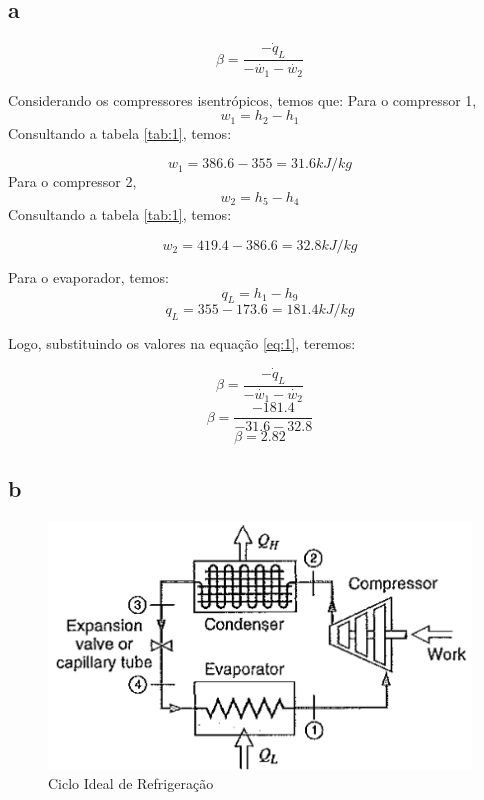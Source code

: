 \documentclass[a4paper, 12pt]{article}
\begin{document}
\subsection{a}

\begin{equation}
\beta = \frac{ -\dot{q}_{L}  }{ -\dot{w_{1}} - \dot{w_{2}} }
\label{eq:1}
\end{equation}

Considerando os compressores isentrópicos, temos que:
Para o compressor 1,
\[w_{1} = h_{2} - h_{1}\]
Consultando a tabela \ref{tab:1}, temos:

\[w_{1} = 386.6 - 355 = 31.6 kJ/kg\]
Para o compressor 2,
\[w_{2} = h_{5} - h_{4}\]
Consultando a tabela \ref{tab:1}, temos:

\[w_{2} = 419.4 - 386.6 = 32.8 kJ/kg\]

Para o evaporador, temos:
\[q_{L} = h_{1} - h_{9}\]
\[q_{L} = 355 - 173.6 = 181.4 kJ/kg\]

Logo, substituindo os valores na equação \ref{eq:1}, teremos:

\[\beta = \frac{ -\dot{q}_{L}  }{ -\dot{w_{1}} - \dot{w_{2}} }\]
\[\beta = \frac{ -181.4  }{ -31.6 - 32.8 } \]
\[\beta = 2.82\]

\pagebreak

\subsection{b}

\begin{figure}[h]
\begin{center}
\includegraphics[scale=0.5]{./fig/2.png}
\caption{\label{fig:2}Ciclo Ideal de Refrigeração} 
\end{center}
\end{figure}
\end{document}
